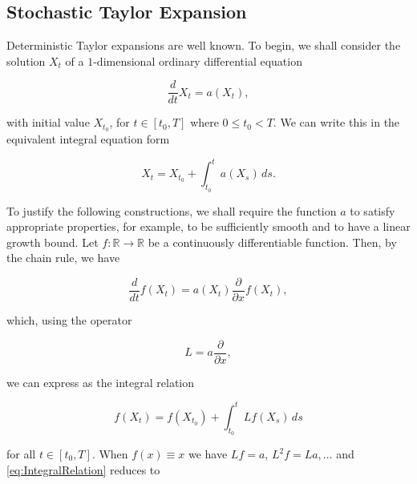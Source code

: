 \subsection{Stochastic Taylor Expansion}
\noindent Deterministic Taylor expansions are well known. To begin, we shall consider the solution $X_t$ of a $1$-dimensional ordinary differential equation

\begin{equation}\label{eq:DifferentialEquation}
    \frac{d}{d t} X_t = a(X_t),
\end{equation}

\noindent with initial value $X_{t_0}$, for $t \in [t_0, T]$ where $0 \leq t_0 < T$. We can write this in the equivalent integral equation form

\begin{equation}\label{eq:DeterministicIntegralEquation}
    X_t = X_{t_0} + \int_{t_0}^t a(X_s) \, ds.
\end{equation}

\noindent To justify the following constructions, we shall require the function $a$ to satisfy appropriate properties, for example, to be sufficiently smooth and to have a linear growth bound. Let $f : \mathbb{R} \to \mathbb{R}$ be a continuously differentiable function. Then, by the chain rule, we have

\begin{equation}\label{eq:ChainRule}
    \frac{d}{d t} f(X_t) = a(X_t) \frac{\partial}{\partial x} f(X_t),
\end{equation}

\noindent which, using the operator

\begin{equation}\label{eq:OperatorDefinition}
    L = a \frac{\partial}{\partial x},
\end{equation}

\noindent we can express as the integral relation

\begin{equation}\label{eq:IntegralRelation}
    f(X_t) = f(X_{t_0}) + \int_{t_0}^t L f(X_s) \, ds
\end{equation}

\noindent for all $t \in [t_0, T]$. When $f(x) \equiv x$ we have $Lf = a$, $L^2 f = La, \dots$ and \eqref{eq:IntegralRelation} reduces to

